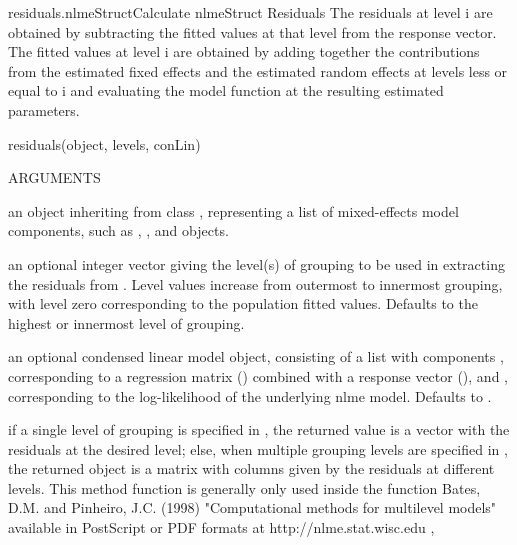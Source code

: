 \documentclass[pdftex]{article} \usepackage{url,graphicx}
\begin{document}
\begin{Helpfile}{residuals.nlmeStruct}{Calculate nlmeStruct Residuals}
The residuals at level i are obtained by subtracting the fitted
values at that level from the response vector. The fitted values at
level i are obtained by adding together the contributions from
the estimated fixed effects and the estimated random effects at levels
less or equal to i and evaluating the model function at the
resulting estimated parameters.
\begin{Example}
residuals(object, levels, conLin)
\end{Example}
\begin{Argument}{ARGUMENTS}
\item[\Co{object:}]
an object inheriting from class ,
representing a list of mixed-effects model components, such as
, , and  objects.
\item[\Co{level:}]
an optional integer vector giving the level(s) of grouping
to be used in extracting the residuals from . Level
values increase from outermost to innermost grouping, with
level zero corresponding to the population fitted values. Defaults to
the highest or innermost level of grouping.
\item[\Co{conLin:}]
an optional condensed linear model object, consisting of
a list with components , corresponding to a regression
matrix () combined with a response vector (), and 
, corresponding to the log-likelihood of the
underlying nlme model. Defaults to .
\end{Argument}
if a single level of grouping is specified in ,
the returned value is a vector with the residuals at the desired
level; else, when multiple grouping levels are specified in
, the returned object is a matrix with 
columns given by the residuals at different levels.
 This method function is generally only used inside
the  function 
Bates, D.M. and Pinheiro, J.C. (1998) "Computational methods for
multilevel models" available in PostScript or PDF formats at
http://nlme.stat.wisc.edu
, 
\end{Helpfile}
\end{document}
